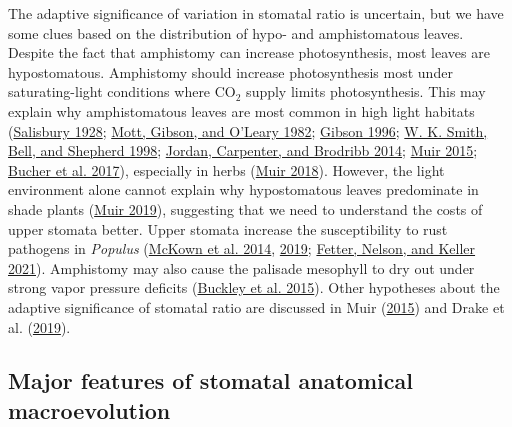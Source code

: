\documentclass[
  12pt,
]{article}
\begin{document}
The adaptive significance of variation in stomatal ratio is uncertain, but we have some clues based on the distribution of hypo- and amphistomatous leaves. Despite the fact that amphistomy can increase photosynthesis, most leaves are hypostomatous. Amphistomy should increase photosynthesis most under saturating-light conditions where CO\(_2\) supply limits photosynthesis. This may explain why amphistomatous leaves are most common in high light habitats (\protect\hyperlink{ref-salisbury_i_1928}{Salisbury 1928}; \protect\hyperlink{ref-mott_adaptive_1982}{Mott, Gibson, and O'Leary 1982}; \protect\hyperlink{ref-gibson_structure-function_1996}{Gibson 1996}; \protect\hyperlink{ref-smith_associations_1998}{W. K. Smith, Bell, and Shepherd 1998}; \protect\hyperlink{ref-jordan_using_2014}{Jordan, Carpenter, and Brodribb 2014}; \protect\hyperlink{ref-muir_making_2015}{Muir 2015}; \protect\hyperlink{ref-bucher_stomatal_2017}{Bucher et al. 2017}), especially in herbs (\protect\hyperlink{ref-muir_light_2018}{Muir 2018}). However, the light environment alone cannot explain why hypostomatous leaves predominate in shade plants (\protect\hyperlink{ref-muir_is_2019}{Muir 2019}), suggesting that we need to understand the costs of upper stomata better. Upper stomata increase the susceptibility to rust pathogens in \emph{Populus} (\protect\hyperlink{ref-mckown_association_2014}{McKown et al. 2014}, \protect\hyperlink{ref-mckown_role_2019}{2019}; \protect\hyperlink{ref-fetter_growthdefense_2021}{Fetter, Nelson, and Keller 2021}). Amphistomy may also cause the palisade mesophyll to dry out under strong vapor pressure deficits (\protect\hyperlink{ref-buckley_how_2015}{Buckley et al. 2015}). Other hypotheses about the adaptive significance of stomatal ratio are discussed in Muir (\protect\hyperlink{ref-muir_making_2015}{2015}) and Drake et al. (\protect\hyperlink{ref-drake_two_2019}{2019}).

\hypertarget{major-features-of-stomatal-anatomical-macroevolution}{%
\subsection{Major features of stomatal anatomical macroevolution}\label{major-features-of-stomatal-anatomical-macroevolution}}
\end{document}
